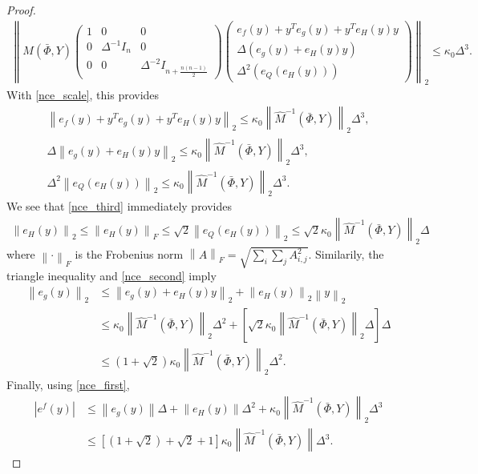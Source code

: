 \begin{proof}
\begin{align*}
\left\|M\left(\bar \Phi, Y\right)\begin{pmatrix}
1 & 0 & 0 \\
0 & \Delta^{-1} I_n & 0 \\
0 & 0 & \Delta^{-2} I_{n + \frac{n(n-1)}{2}}
\end{pmatrix}
\begin{pmatrix}
e_f(y) + y^Te_g(y) + y^Te_H(y) y \\
\Delta\left(e_g(y) + e_H(y) y\right) \\
\Delta^2\left(e_Q\left(e_H(y)\right)\right)
\end{pmatrix} \right\|_2
\le \kappa_0 \Delta^3.
\end{align*}
With \cref{nce_scale}, this provides
\begin{align}
\left\|e_f(y) + y^Te_g(y) + y^Te_H(y) y \right\|_2\le \kappa_0 \left\|\hat M^{-1}(\bar \Phi, Y) \right\|_2 \Delta^3, \label{nce_first}\\
\Delta \left\|e_g(y) + e_H(y) y \right\|_2 \le \kappa_0 \left\|\hat M^{-1}(\bar \Phi, Y) \right\|_2  \Delta^3, \label{nce_second} \\
\Delta^2 \left\|e_Q\left(e_H(y)\right)\right\|_2 \le \kappa_0 \left\|\hat M^{-1}(\bar \Phi, Y) \right\|_2  \Delta^3. \label{nce_third}
\end{align}
We see that \cref{nce_third} immediately provides
\begin{align*}
\left\|e_H(y)\right\|_2 
\le \left\|e_H(y)\right\|_F 
\le \sqrt{2} \left\|e_Q\left(e_H(y)\right)\right\|_2
\le \sqrt{2}\kappa_0 \left\|\hat M^{-1}(\bar \Phi, Y) \right\|_2 \Delta
\end{align*}
where $\left\|\cdot\right\|_F$ is the Frobenius norm $\left\|A\right\|_F = \sqrt{\sum_i\sum_jA_{i, j}^2}$.
Similarily, the triangle inequality and \cref{nce_second} imply
\begin{align*}
\left\|e_g\left(y\right)\right\|_2 &\le \left\|e_g(y) + e_H(y) y \right\|_2 + \left\|e_H\left(y\right)\right\|_2\left\| y\right\|_2 \\
&\le \kappa_0 \left\|\hat M^{-1}(\bar \Phi, Y) \right\|_2 \Delta^2
+ \left[\sqrt{2}\kappa_0 \left\|\hat M^{-1}(\bar \Phi, Y) \right\|_2 \Delta\right]
\Delta \\
&\le\left(1 + \sqrt 2\right)\kappa_0\left\|\hat M^{-1}(\bar \Phi, Y) \right\|_2 \Delta^2.
\end{align*}
Finally, using \cref{nce_first},
\begin{align*}
\left|e^f\left(y\right)\right| &\le \left\|e_g(y)\right\| \Delta + \left\|e_H(y)\right\|\Delta^2
+ \kappa_0 \left\|\hat M^{-1}(\bar \Phi, Y) \right\|_2 \Delta^3 \\
&\le\left[\left(1 + \sqrt 2\right) + \sqrt{2} + 1\right]\kappa_0 \left\|\hat M^{-1}(\bar \Phi, Y) \right\|\Delta^3.
\end{align*}
\end{proof}

